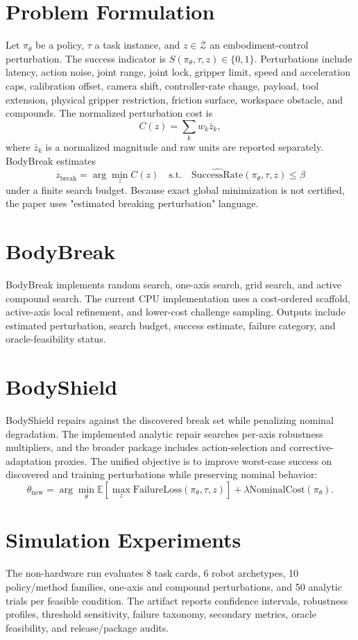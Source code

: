 \documentclass[10pt,conference]{IEEEtran}
\begin{document}


\section{Problem Formulation}
Let $\pi_\theta$ be a policy, $\tau$ a task instance, and $z \in \mathcal{Z}$ an embodiment-control perturbation. The success indicator is $S(\pi_\theta,\tau,z) \in \{0,1\}$. Perturbations include latency, action noise, joint range, joint lock, gripper limit, speed and acceleration caps, calibration offset, camera shift, controller-rate change, payload, tool extension, physical gripper restriction, friction surface, workspace obstacle, and compounds. The normalized perturbation cost is
\[
C(z)=\sum_k w_k \bar{z}_k,
\]
where $\bar{z}_k$ is a normalized magnitude and raw units are reported separately. BodyBreak estimates
\[
z_{\mathrm{break}}=\arg\min_z C(z) \quad \textrm{s.t.} \quad \widehat{\mathrm{SuccessRate}}(\pi_\theta,\tau,z) \leq \beta
\]
under a finite search budget. Because exact global minimization is not certified, the paper uses "estimated breaking perturbation" language.

\section{BodyBreak}
BodyBreak implements random search, one-axis search, grid search, and active compound search. The current CPU implementation uses a cost-ordered scaffold, active-axis local refinement, and lower-cost challenge sampling. Outputs include estimated perturbation, search budget, success estimate, failure category, and oracle-feasibility status.

\section{BodyShield}
BodyShield repairs against the discovered break set while penalizing nominal degradation. The implemented analytic repair searches per-axis robustness multipliers, and the broader package includes action-selection and corrective-adaptation proxies. The unified objective is to improve worst-case success on discovered and training perturbations while preserving nominal behavior:
\[
\theta_{\mathrm{new}} = \arg\min_\theta \mathbb{E}[\max_z \mathrm{FailureLoss}(\pi_\theta,\tau,z)] + \lambda \mathrm{NominalCost}(\pi_\theta).
\]

\section{Simulation Experiments}
The non-hardware run evaluates 8 task cards, 6 robot archetypes, 10 policy/method families, one-axis and compound perturbations, and 50 analytic trials per feasible condition. The artifact reports confidence intervals, robustness profiles, threshold sensitivity, failure taxonomy, secondary metrics, oracle feasibility, and release/package audits.
\end{document}
